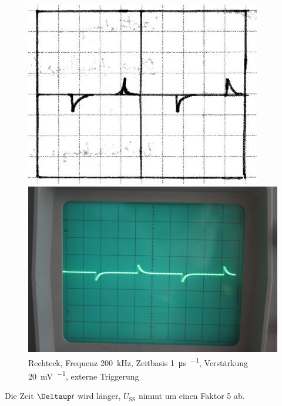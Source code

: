 \begin{figure}[htbp]
	\centering
	\begin{minipage}{.45\linewidth}
	\includegraphics[width=\linewidth]{Skizzen/IMG_0755-1500.jpg}
	\end{minipage}
	\hfill
	\begin{minipage}{.45\linewidth}
	\includegraphics[width=\linewidth]{Fotos/IMG_0755-1500.jpg}
	\end{minipage}
	\caption{%
		Rechteck, Frequenz \SI{200}{\kilo\hertz}, Zeitbasis \SI{1}{\micro\second\per\division}, Verstärkung \SI{20}{\milli\volt\per\division}, externe Triggerung
	}
	\label{fig:0755}
\end{figure}

Die Zeit $\Deltaup t$ wird länger, $U_\text{SS}$ nimmt um einen Faktor 5 ab.

